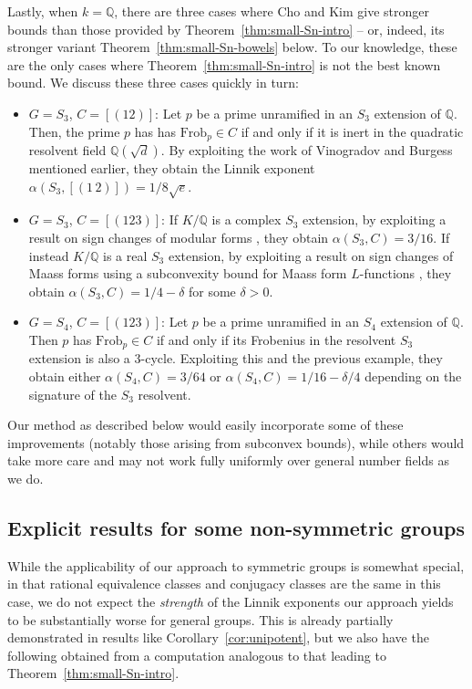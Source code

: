 \documentclass[12pt]{amsart}
\theoremstyle{definition} \newtheorem{definition}[theorem]{Definition}
\theoremstyle{example} \newtheorem{example}[theorem]{Example}
\theoremstyle{remark} \newtheorem{remark}{Remark}[theorem]
\numberwithin{equation}{section}
\numberwithin{theorem}{section}
\begin{document}
	Lastly, when $k=\mathbb{Q}$, there are three cases where Cho and Kim \cite{ChoKim-SignChange} give stronger bounds than those provided by Theorem~\ref{thm:small-Sn-intro} -- or, indeed, its stronger variant Theorem~\ref{thm:small-Sn-bowels} below.  To our knowledge, these are the only cases where Theorem~\ref{thm:small-Sn-intro} is not the best known bound.  We discuss these three cases quickly in turn:
		\begin{itemize}
			\item $G=S_3$, $C=[(12)]$:  Let $p$ be a prime unramified in an $S_3$ extension of $\mathbb{Q}$. Then, the prime $p$ has has $\mathrm{Frob}_p \in C$ if and only if it is inert in the quadratic resolvent field $\mathbb{Q}(\sqrt{d})$. By exploiting the work of Vinogradov and Burgess mentioned earlier, they obtain the Linnik exponent $\alpha(S_3,[(1\,2)]) = {1}/{8\sqrt{e}}$.  

			\item $G=S_3$, $C=[(123)]$: If $K/\mathbb{Q}$ is a complex $S_3$ extension, by exploiting a result on sign changes of modular forms \cite{Matomaki-SignChange}, they obtain $\alpha(S_3,C) = 3/16$.  If instead $K/\mathbb{Q}$ is a real $S_3$ extension, by exploiting a  result on sign changes of Maass forms \cite{Qu-SignChange} using a subconvexity bound for Maass form $L$-functions \cite{MichelVenkatesh-SubconvexityGL2}, they obtain $\alpha(S_3,C) = 1/4 - \delta$ for some $\delta > 0$. 

			\item $G=S_4$, $C=[(123)]$: Let $p$ be a prime unramified in an $S_4$ extension of $\mathbb{Q}$.  Then $p$ has $\mathrm{Frob}_p \in C$ if and only if its Frobenius in the resolvent $S_3$ extension is also a $3$-cycle.  Exploiting this and the previous example, they obtain either $\alpha(S_4,C)=3/64$ or $\alpha(S_4,C)=1/16 - \delta/4$ depending on the signature of the $S_3$ resolvent.
		\end{itemize}
	
	Our method as described below would easily incorporate some of these improvements (notably those arising from subconvex bounds), while others would take more care and may not work fully uniformly over general number fields as we do.
	
\subsection{Explicit results for some non-symmetric groups}	
	
	While the applicability of our approach to symmetric groups is somewhat special, in that rational equivalence classes and conjugacy classes are the same in this case, we do not expect the \emph{strength} of the Linnik exponents our approach yields to be substantially worse for general groups.	
	This is already partially demonstrated in results like Corollary~\ref{cor:unipotent}, but we also have the following obtained from a computation analogous to that leading to Theorem~\ref{thm:small-Sn-intro}.  
	
\end{document}
